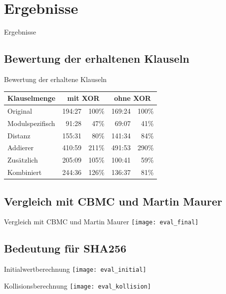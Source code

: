 \documentclass{beamer}
\begin{document}
\section{Ergebnisse}
  \begin{frame}{}
    \begin{center}
      \Huge Ergebnisse
    \end{center}
  \end{frame}
  \subsection{Bewertung der erhaltenen Klauseln}
    \begin{frame}{Bewertung der erhaltene Klauseln}
      \begin{tabular}{l|rr|rr}
	Klauselmenge    & \multicolumn{2}{c|}{mit XOR} & \multicolumn{2}{c}{ohne XOR} \\
	\hline
	Original        &  194:27 & 100\% &   169:24 & 100\% \\
	\hline
	Modulspezifisch &   91:28 &  47\% &    69:07 &  41\% \\
	Distanz         &  155:31 &  80\% &   141:34 &  84\% \\
	Addierer        &  410:59 & 211\% &   491:53 & 290\% \\
	Zusätzlich      &  205:09 & 105\% &   100:41 &  59\% \\
	\hline
	Kombiniert      &  244:36 & 126\% &   136:37 &  81\%    
      \end{tabular}
    \end{frame}
  \subsection{Vergleich mit CBMC und Martin Maurer}
    \begin{frame}{Vergleich mit CBMC und Martin Maurer}
      \texttt{[image: eval\_final]}
    \end{frame}
  \subsection{Bedeutung für SHA256}
    \begin{frame}{Initialwertberechnung}
      \texttt{[image: eval\_initial]}
    \end{frame}
    \begin{frame}{Kollisionsberechnung}
      \texttt{[image: eval\_kollision]}
    \end{frame}
\end{document}
